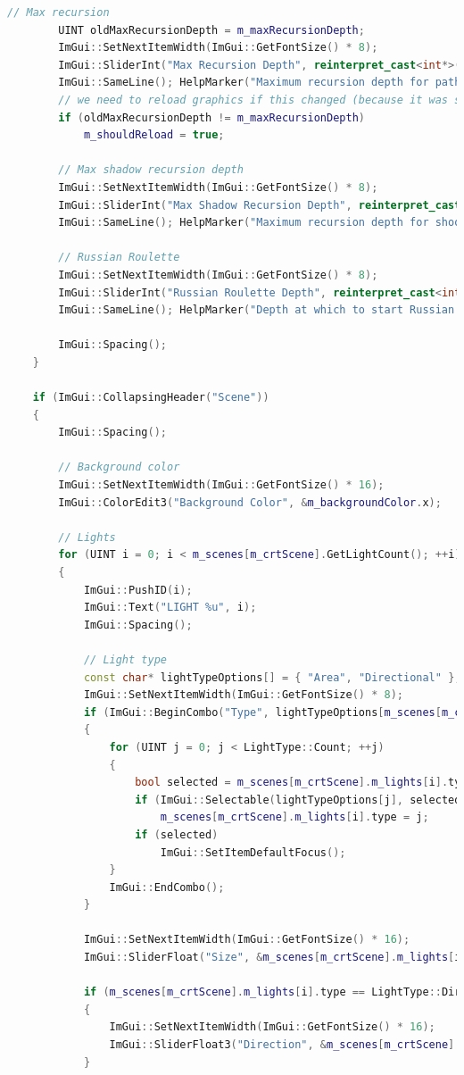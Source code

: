 \documentclass[12pt,a4paper]{report}
\numberwithin{equation}{section} %
\begin{document}
\begin{appendices}
\begin{lstlisting}[caption={Compunerea meniului ImGui},label={lst:showui},language=C++]
		// Max recursion
		UINT oldMaxRecursionDepth = m_maxRecursionDepth;
		ImGui::SetNextItemWidth(ImGui::GetFontSize() * 8);
		ImGui::SliderInt("Max Recursion Depth", reinterpret_cast<int*>(&m_maxRecursionDepth), 1, 10);
		ImGui::SameLine(); HelpMarker("Maximum recursion depth for path tracing");
		// we need to reload graphics if this changed (because it was set in stone for optimization purposes)
		if (oldMaxRecursionDepth != m_maxRecursionDepth)
			m_shouldReload = true;

		// Max shadow recursion depth
		ImGui::SetNextItemWidth(ImGui::GetFontSize() * 8);
		ImGui::SliderInt("Max Shadow Recursion Depth", reinterpret_cast<int*>(&m_maxShadowRecursionDepth), 1, 10);
		ImGui::SameLine(); HelpMarker("Maximum recursion depth for shooting shadow rays");

		// Russian Roulette
		ImGui::SetNextItemWidth(ImGui::GetFontSize() * 8);
		ImGui::SliderInt("Russian Roulette Depth", reinterpret_cast<int*>(&m_russianRouletteDepth), 1, 10);
		ImGui::SameLine(); HelpMarker("Depth at which to start Russian Roulette");

		ImGui::Spacing();
	}

	if (ImGui::CollapsingHeader("Scene"))
	{
		ImGui::Spacing();

		// Background color
		ImGui::SetNextItemWidth(ImGui::GetFontSize() * 16);
		ImGui::ColorEdit3("Background Color", &m_backgroundColor.x);

		// Lights
		for (UINT i = 0; i < m_scenes[m_crtScene].GetLightCount(); ++i)
		{
			ImGui::PushID(i);
			ImGui::Text("LIGHT %u", i);
			ImGui::Spacing();

			// Light type
			const char* lightTypeOptions[] = { "Area", "Directional" };
			ImGui::SetNextItemWidth(ImGui::GetFontSize() * 8);
			if (ImGui::BeginCombo("Type", lightTypeOptions[m_scenes[m_crtScene].m_lights[i].type]))
			{
				for (UINT j = 0; j < LightType::Count; ++j)
				{
					bool selected = m_scenes[m_crtScene].m_lights[i].type == j;
					if (ImGui::Selectable(lightTypeOptions[j], selected))
						m_scenes[m_crtScene].m_lights[i].type = j;
					if (selected)
						ImGui::SetItemDefaultFocus();
				}
				ImGui::EndCombo();
			}

			ImGui::SetNextItemWidth(ImGui::GetFontSize() * 16);
			ImGui::SliderFloat("Size", &m_scenes[m_crtScene].m_lights[i].size, 0.1f, 10.0f);

			if (m_scenes[m_crtScene].m_lights[i].type == LightType::Directional)
			{
				ImGui::SetNextItemWidth(ImGui::GetFontSize() * 16);
				ImGui::SliderFloat3("Direction", &m_scenes[m_crtScene].m_lights[i].direction.x, -1.0f, 1.0f);
			}


\end{lstlisting}
\end{appendices}
\end{document}
